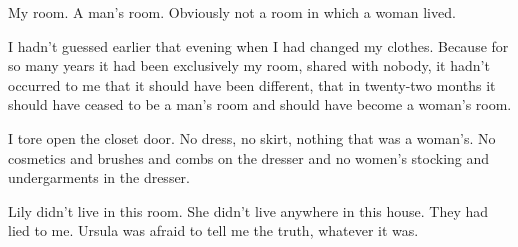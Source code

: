\documentclass{novel}
\begin{document}
{My room. A man’s room. Obviously not a room in which a woman lived.

I hadn’t guessed earlier that evening when I had changed my clothes. Because for so many years it had been exclusively my room, shared with nobody, it hadn’t occurred to me that it should have been different, that in twenty-two months it should have ceased to be a man’s room and should have become a woman’s room.

I tore open the closet door. No dress, no skirt, nothing that was a woman’s. No cosmetics and brushes and combs on the dresser and no women’s stocking and undergarments in the dresser.

Lily didn’t live in this room. She didn’t live anywhere in this house. They had lied to me. Ursula was afraid to tell me the truth, whatever it was.

}

\vspace{2\nbs}
\clearpage
\thispagestyle{empty}
\end{document}
